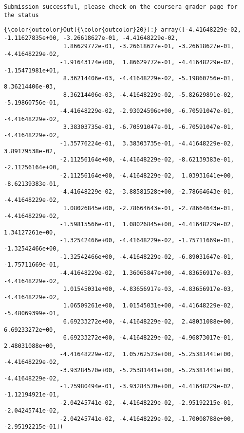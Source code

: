 \documentclass[11pt]{article}
\begin{document}
    \begin{Verbatim}[commandchars=\\\{\}]
Submission successful, please check on the coursera grader page for the status

    \end{Verbatim}

\begin{Verbatim}[commandchars=\\\{\}]
{\color{outcolor}Out[{\color{outcolor}20}]:} array([-4.41648229e-02, -1.11627835e+00, -3.26618627e-01, -4.41648229e-02,
                 1.86629772e-01, -3.26618627e-01, -3.26618627e-01, -4.41648229e-02,
                -1.91643174e+00,  1.86629772e-01, -4.41648229e-02, -1.15471981e+01,
                 8.36214406e-03, -4.41648229e-02, -5.19860756e-01,  8.36214406e-03,
                 8.36214406e-03, -4.41648229e-02, -5.82629891e-02, -5.19860756e-01,
                -4.41648229e-02, -2.93024596e+00, -6.70591047e-01, -4.41648229e-02,
                 3.38303735e-01, -6.70591047e-01, -6.70591047e-01, -4.41648229e-02,
                -1.35776224e-01,  3.38303735e-01, -4.41648229e-02,  3.89179538e-02,
                -2.11256164e+00, -4.41648229e-02, -8.62139383e-01, -2.11256164e+00,
                -2.11256164e+00, -4.41648229e-02,  1.03931641e+00, -8.62139383e-01,
                -4.41648229e-02, -3.88581528e+00, -2.78664643e-01, -4.41648229e-02,
                 1.08026845e+00, -2.78664643e-01, -2.78664643e-01, -4.41648229e-02,
                -1.59815566e-01,  1.08026845e+00, -4.41648229e-02,  1.34127261e+00,
                -1.32542466e+00, -4.41648229e-02, -1.75711669e-01, -1.32542466e+00,
                -1.32542466e+00, -4.41648229e-02, -6.89031647e-01, -1.75711669e-01,
                -4.41648229e-02,  1.36065847e+00, -4.83656917e-03, -4.41648229e-02,
                 1.01545031e+00, -4.83656917e-03, -4.83656917e-03, -4.41648229e-02,
                 1.06509261e+00,  1.01545031e+00, -4.41648229e-02, -5.48069399e-01,
                 6.69233272e+00, -4.41648229e-02,  2.48031088e+00,  6.69233272e+00,
                 6.69233272e+00, -4.41648229e-02, -4.96873017e-01,  2.48031088e+00,
                -4.41648229e-02,  1.05762523e+00, -5.25381441e+00, -4.41648229e-02,
                -3.93284570e+00, -5.25381441e+00, -5.25381441e+00, -4.41648229e-02,
                -1.75980494e-01, -3.93284570e+00, -4.41648229e-02, -1.12194921e-01,
                -2.04245741e-02, -4.41648229e-02, -2.95192215e-01, -2.04245741e-02,
                -2.04245741e-02, -4.41648229e-02, -1.70008788e+00, -2.95192215e-01])
\end{Verbatim}
            
\end{document}
